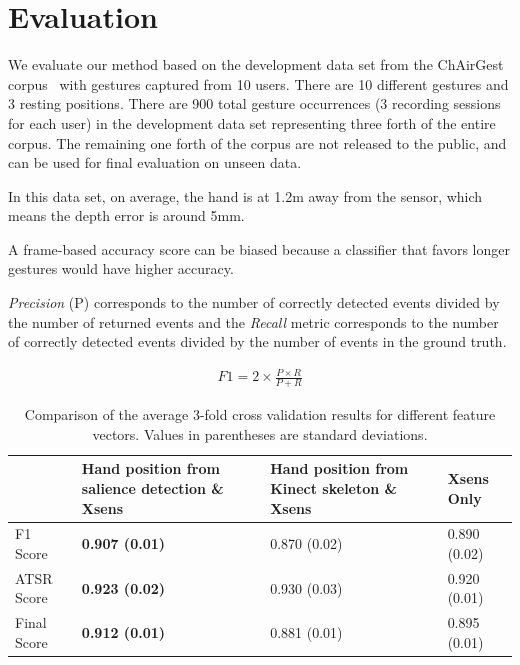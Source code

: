 \chapter{Evaluation}\label{sec:evaluation}
\cite{escalera2013}
We evaluate our method based on the development data set from the ChAirGest
corpus~\cite{Ruffieux2013} with gestures captured from 10 users. There are
10 different gestures and 3 resting positions. There are 900 total gesture
occurrences (3 recording sessions for each user) in the development data set representing three forth of the entire corpus. The remaining one forth of the corpus are not released to
the public, and can be used for final evaluation on unseen data.

In this data set, on average, the hand is at 1.2m away
from the sensor, which means the depth error is around 5mm.

A frame-based accuracy score can be biased because a classifier that
favors longer gestures would have higher accuracy.

\textit{Precision} (P) corresponds to the number of correctly detected events
divided by the number of returned events and the \textit{Recall} metric
corresponds to the number of correctly detected events divided by the number of
events in the ground truth. \cite{Ruffieux2013}

\begin{align}
F1 = 2\times\frac{P \times R}{P + R}
\end{align}

\begin{table}[h]
\begin{center}
\begin{tabular}{|l|p{2cm}|p{1.7cm}|p{1.7cm}|}
\hline
 & Hand position from salience detection \& Xsens & Hand position
 from Kinect skeleton \& Xsens & Xsens Only \\
\hline
F1 Score & \textbf{0.907 (0.01)} & 0.870 (0.02) & 0.890 (0.02) \\
\hline
ATSR Score & \textbf{0.923 (0.02)} & 0.930 (0.03) & 0.920 (0.01) \\
\hline
Final Score & \textbf{0.912 (0.01)} & 0.881 (0.01) & 0.895 (0.01) \\
\hline
\end{tabular}
\caption{Comparison of the average 3-fold cross validation results for different
feature vectors. Values in parentheses are standard deviations.}
\label{tab:comp-feature}
\end{center}
\end{table}

